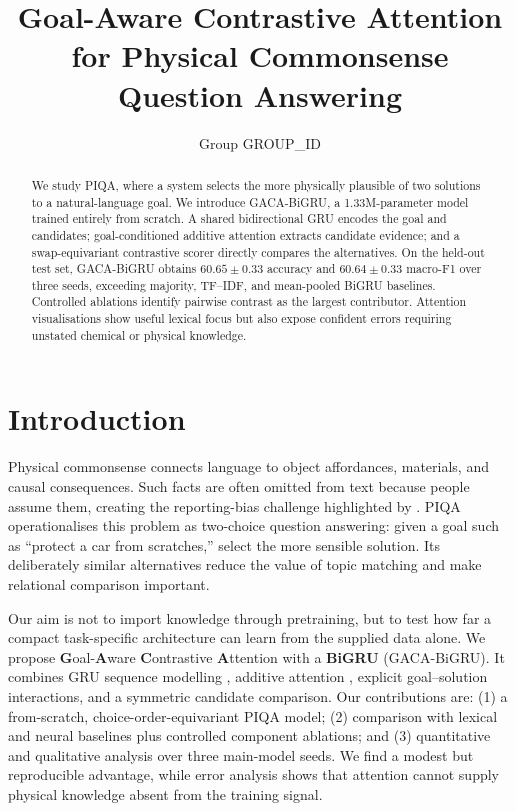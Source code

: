 \documentclass[11pt]{article}
\title{Goal-Aware Contrastive Attention for Physical Commonsense Question Answering}
\author{Group GROUP\_ID}
\newcommand{\model}{GACA-BiGRU\xspace}
\begin{document}
\maketitle

\begin{abstract}
We study PIQA, where a system selects the more physically plausible of two solutions to a natural-language goal. We introduce \model, a 1.33M-parameter model trained entirely from scratch. A shared bidirectional GRU encodes the goal and candidates; goal-conditioned additive attention extracts candidate evidence; and a swap-equivariant contrastive scorer directly compares the alternatives. On the held-out test set, \model obtains $60.65\pm0.33$ accuracy and $60.64\pm0.33$ macro-F1 over three seeds, exceeding majority, TF--IDF, and mean-pooled BiGRU baselines. Controlled ablations identify pairwise contrast as the largest contributor. Attention visualisations show useful lexical focus but also expose confident errors requiring unstated chemical or physical knowledge.
\end{abstract}

\section{Introduction}
Physical commonsense connects language to object affordances, materials, and causal consequences. Such facts are often omitted from text because people assume them, creating the reporting-bias challenge highlighted by \citet{bisk2020piqa}. PIQA operationalises this problem as two-choice question answering: given a goal such as ``protect a car from scratches,'' select the more sensible solution. Its deliberately similar alternatives reduce the value of topic matching and make relational comparison important.

Our aim is not to import knowledge through pretraining, but to test how far a compact task-specific architecture can learn from the supplied data alone. We propose \textbf{G}oal-\textbf{A}ware \textbf{C}ontrastive \textbf{A}ttention with a \textbf{BiGRU} (\model). It combines GRU sequence modelling \citep{cho2014gru}, additive attention \citep{bahdanau2015attention}, explicit goal--solution interactions, and a symmetric candidate comparison. Our contributions are: (1) a from-scratch, choice-order-equivariant PIQA model; (2) comparison with lexical and neural baselines plus controlled component ablations; and (3) quantitative and qualitative analysis over three main-model seeds. We find a modest but reproducible advantage, while error analysis shows that attention cannot supply physical knowledge absent from the training signal.
\end{document}
